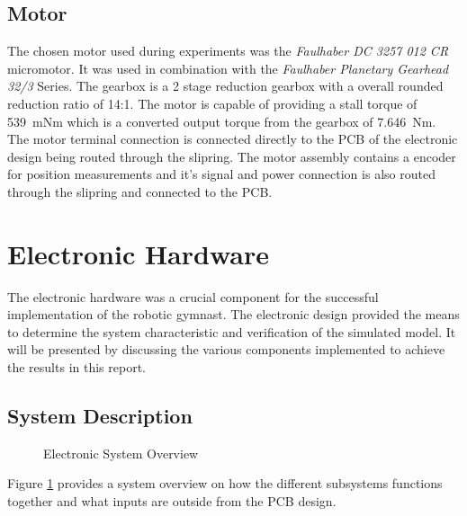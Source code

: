 \subsection{Motor}
The chosen motor used during experiments was the \textit{Faulhaber DC 3257 012 CR} micromotor. It was used in combination with the \textit{Faulhaber Planetary Gearhead 32/3} Series. The gearbox is a 2 stage reduction gearbox with a overall rounded reduction ratio of 14:1. The motor is capable of providing a stall torque of \SI{539}{mNm} which is a converted output torque from the gearbox of \SI{7.646}{Nm}.\\

The motor terminal connection is connected directly to the PCB of the electronic design being routed through the slipring. The motor assembly contains a encoder for position measurements and it's signal and power connection is also routed through the slipring and connected to the PCB.\\

\section{Electronic Hardware}
The electronic hardware was a crucial component for the successful implementation of the robotic gymnast. The electronic design provided the means to determine the system characteristic and verification of the simulated model. It will be presented by discussing the various components implemented to achieve the results in this report.

\subsection{System Description}

\begin{figure}[h]
	\centering
	
	\caption{Electronic System Overview}
	\label{fig:electronicSystemOverview}
\end{figure}



Figure \ref{fig:electronicSystemOverview} provides a system overview on how the different subsystems functions together and what inputs are outside from the PCB design.\\

